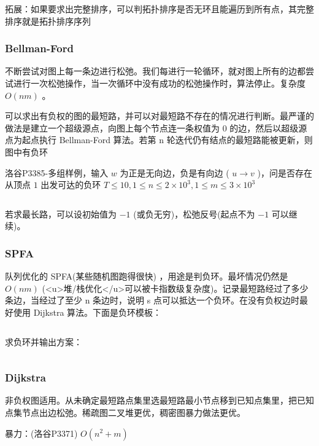 \documentclass[twocolumn,10pt]{ctexart}
\begin{document}
\inputminted{cpp}{code/poj3660_floyd_bitset.cpp}

拓展：如果要求出完整排序，可以判拓扑排序是否无环且能遍历到所有点，其完整排序就是拓扑排序序列

\subsubsection{Bellman-Ford}

不断尝试对图上每一条边进行松弛。我们每进行一轮循环，就对图上所有的边都尝试进行一次松弛操作，当一次循环中没有成功的松弛操作时，算法停止。复杂度 $O(nm)$ 。

可以求出有负权的图的最短路，并可以对最短路不存在的情况进行判断。最严谨的做法是建立一个超级源点，向图上每个节点连一条权值为 0 的边，然后以超级源点为起点执行 Bellman-Ford 算法。若第 n 轮迭代仍有结点的最短路能被更新，则图中有负环

\begin{notebox}
洛谷P3385-多组样例，输入 $w$ 为正是无向边，负是有向边 ( $u\to v$ )，问是否存在从顶点 $1$ 出发可达的负环 $T\le10,\allowbreak{}1\le n\le2\times10^3,\allowbreak{}1\le m\le3\times10^3$
\end{notebox}

\inputminted{cpp}{code/ext_035.cpp}

若求最长路，可以设初始值为 $-1$ (或负无穷)，松弛反号(起点不为 $-1$ 可以继续)。

\subsubsection{SPFA}

队列优化的 SPFA(某些随机图跑得很快) ，用途是判负环。最坏情况仍然是 $O(nm)$ (<u>堆/栈优化</u>可以被卡指数级复杂度)。记录最短路经过了多少条边，当经过了至少 n 条边时，说明 s 点可以抵达一个负环。在没有负权边时最好使用 Dijkstra 算法。下面是负环模板：

\inputminted{cpp}{code/ext_036.cpp}

求负环并输出方案：

\inputminted{cpp}{code/ext_037.cpp}

\subsubsection{Dijkstra}

非负权图适用。从未确定最短路点集里选最短路最小节点移到已知点集里，把已知点集节点出边松弛。稀疏图二叉堆更优，稠密图暴力做法更优。

暴力：(洛谷P3371) $O(n^2+m)$
\end{document}

